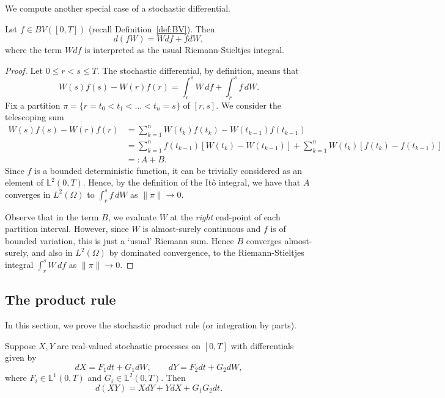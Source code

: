We compute another special case of a stochastic differential.
\begin{lemma}
\label{lem:BV-times-W}
    Let $f\in BV([0,T])$ (recall Definition~\ref{def:BV}). Then
    \begin{equation*}
        d(fW) = Wdf + fdW,
    \end{equation*}
    where the term $Wdf$ is interpreted as the usual Riemann-Stieltjes integral.
\end{lemma}

\begin{proof}
    Let $0\le r<s\le T$. The stochastic differential, by definition, means that
    \begin{equation*}
        W(s)f(s)-W(r)f(r) = \int_r^s W \,df + \int_r^s f\,dW.
    \end{equation*}
    Fix a partition $\pi=\{r=t_0<t_1<\ldots <t_n=s\}$ of $[r,s]$. We consider the telescoping sum
    \begin{align*}
        W(s)f(s)-W(r)f(r) &= \sum_{k=1}^n W(t_k)f(t_k) - W(t_{k-1})f(t_{k-1})\\
        &= \sum_{k=1}^n f(t_{k-1})[W(t_k)-W(t_{k-1})] + \sum_{k=1}^n W(t_k)[f(t_k)-f(t_{k-1})] \\
        &=: A + B.
    \end{align*}
    Since $f$ is a bounded deterministic function, it can be trivially considered as an element of $\mathbb{L}^2(0,T)$. Hence, by the definition of the It\^{o} integral, we have that $A$ converges in $L^2(\Omega)$ to $\int_r^s f\,dW$ as $\|\pi\|\to 0$. 
    
    Observe that in the term $B$, we evaluate $W$ at the \emph{right} end-point of each partition interval. However, since $W$ is almost-surely continuous and $f$ is of bounded variation, this is just a `usual' Riemann sum. Hence $B$ converges almost-surely, and also in $L^2(\Omega)$ by dominated convergence, to the Riemann-Stieltjes integral $\int_r^s W\,df$ as $\|\pi\|\to 0$.
\end{proof}

\subsection{The product rule}
In this section, we prove the stochastic product rule (or integration by parts).

\begin{theorem}
\label{thm:stoch-prod-rule}
Suppose $X,Y$ are real-valued stochastic processes on $[0,T]$ with differentials given by
\begin{equation*}
    dX = F_1 dt + G_1 dW, \qquad dY = F_2 dt + G_2 dW,
\end{equation*}
where $F_i\in\mathbb{L}^1(0,T)$ and $G_i\in\mathbb{L}^2(0,T)$. Then
\begin{equation}
    d(XY) = XdY + YdX + G_1 G_2 dt.
\end{equation}
\end{theorem}

